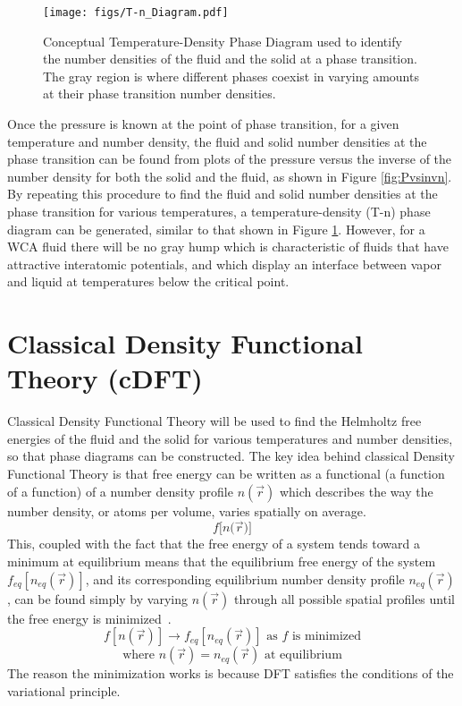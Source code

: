 \documentclass[double,12pt]{beavtex}
\begin{document}
\begin{figure}
    \centering
    \texttt{[image: figs/T-n\_Diagram.pdf]}
    \caption{Conceptual Temperature-Density Phase Diagram used to identify 
    the number densities of the fluid and the solid at a phase 
    transition. The gray region is where different phases coexist in 
    varying amounts at their phase transition number densities.}
    \label{fig:T-n_Diagram}
  \end{figure} 
  
Once the pressure is known at the point of phase transition, for a given 
temperature and number density, the fluid and solid number densities at 
the phase transition can be found from plots of the pressure versus the 
inverse of the number density for both the solid and the fluid, 
as shown in Figure \ref{fig:Pvsinvn}. By repeating this procedure to 
find the fluid and solid number densities at the phase transition 
for various temperatures, a temperature-density (T-n) phase diagram 
can be generated, similar to that shown in Figure \ref{fig:T-n_Diagram}. 
However, for a WCA fluid there will be no gray hump which is characteristic 
of fluids that have attractive interatomic potentials, and which display
an interface between vapor and liquid at temperatures below the critical point.

\section{Classical Density Functional Theory (cDFT)}

Classical Density Functional Theory will be used to find the 
Helmholtz free energies of the fluid and the solid for various 
temperatures and number densities, so that phase diagrams can be 
constructed. 
The key idea behind classical Density Functional Theory is that 
free energy can be written as a functional (a function of a function) of 
a number density profile $n(\vec{r})$ which describes the way the number 
density, or atoms per volume, varies spatially on average. 
\begin{displaymath}{f[n(}\vec{r}{)]}\end{displaymath}
This, coupled with the fact that the free energy of a system tends toward 
a minimum at equilibrium means that the equilibrium free energy of the 
system $f_{eq}[n_{eq}(\vec r)]$, and its corresponding equilibrium 
number density profile $n_{eq}(\vec r)$, can be found simply by varying 
$n(\vec{r})$ through all possible spatial profiles until the free energy 
is minimized~\cite{MoritaDFT}. 
\begin{displaymath}f[n(\vec r)]\rightarrow f_{eq}[n_{eq}(\vec r)]  \mbox{ as $f$ is minimized} \end{displaymath}
\begin{displaymath}{\mbox{where }  n(\vec{r})=n_{eq}(\vec r)  \mbox{ at equilibrium}}\end{displaymath}
The reason the minimization works is because DFT satisfies the conditions 
of the variational principle. 
\end{document}
